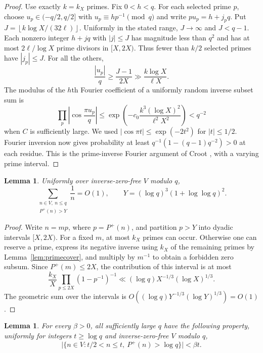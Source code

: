 \documentclass[11pt,leqno]{amsart}
\numberwithin{equation}{section}
\newtheorem{lemma}[theorem]{Lemma}
\theoremstyle{definition}
\theoremstyle{remark}
\newcommand{\Ph}{P^{+}}
\newcommand{\card}[1]{\lvert #1\rvert}
\newcommand{\floor}[1]{\left\lfloor #1\right\rfloor}
\begin{document}
\begin{proof}
Use exactly $k=k_X$ primes. Fix $0<h<q$. For each selected prime $p$,
choose $u_p\in(-q/2,q/2]$ with $u_p\equiv hp^{-1}\pmod q$ and write
$pu_p=h+j_pq$. Put $J=\floor{k\log X/(32\ell)}$.
Uniformly in the stated range, $J\longrightarrow\infty$ and $J<q-1$.
Each nonzero integer $h+jq$ with $|j|\le J$ has magnitude less than $q^2$
and has at most $2\ell/\log X$ prime divisors in $[X,2X)$.
Thus fewer than $k/2$ selected primes have $|j_p|\le J$.
For all the others,
\[
 \frac{|u_p|}{q}\ge\frac{J-1}{2X}
 \gg\frac{k\log X}{\ell X}.
\]
The modulus of the $h$th Fourier coefficient of a uniformly random
inverse subset sum is
\[
 \prod_p\left|\cos\frac{\pi u_p}{q}\right|
 \le\exp\left(-c_0\frac{k^3(\log X)^2}{\ell^2X^2}\right)
 <q^{-2}
\]
when $C$ is sufficiently large. We used
$|\cos\pi t|\le\exp(-2t^2)$ for $|t|\le1/2$.
Fourier inversion now gives probability at least
$q^{-1}(1-(q-1)q^{-2})>0$ at each residue.
This is the prime-inverse Fourier argument of Croot
\cite[Lemma~1 of the preprint]{Croot}, with a varying prime interval.
\end{proof}

\begin{lemma}\label{lem:largeprimeweight}
Uniformly over inverse-zero-free $V$ modulo $q$,
\[
 \sum_{\substack{n\in V,\ n\le q\\\Ph(n)>Y}}\frac1n=O(1),
 \qquad Y=(\log q)^3(1+\log\log q)^2.
\]
\end{lemma}

\begin{proof}
Write $n=mp$, where $p=\Ph(n)$, and partition $p>Y$ into dyadic
intervals $[X,2X)$. For a fixed $m$, at most $k_X$ primes can occur.
Otherwise one can reserve a prime, express its negative inverse using
$k_X$ of the remaining primes by Lemma~\ref{lem:primecover}, and multiply
by $m^{-1}$ to obtain a forbidden zero subsum.
Since $\Ph(m)\le2X$, the contribution of this interval is at most
\[
 \frac{k_X}{X}\prod_{p\le2X}(1-p^{-1})^{-1}
 \ll (\log q)X^{-1/3}(\log X)^{1/3}.
\]
The geometric sum over the intervals is
$O((\log q)Y^{-1/3}(\log Y)^{1/3})=O(1)$.
\end{proof}

\begin{lemma}\label{lem:localdensity}
For every $\beta>0$, all sufficiently large $q$ have the following
property, uniformly for integers $t\ge\log q$ and inverse-zero-free $V$
modulo $q$,
\begin{equation}\label{eq:localdensity}
 \card{\{n\in V:t/2<n\le t,\ \Ph(n)>\log q\}}<\beta t.
\end{equation}
\end{lemma}
\end{document}
